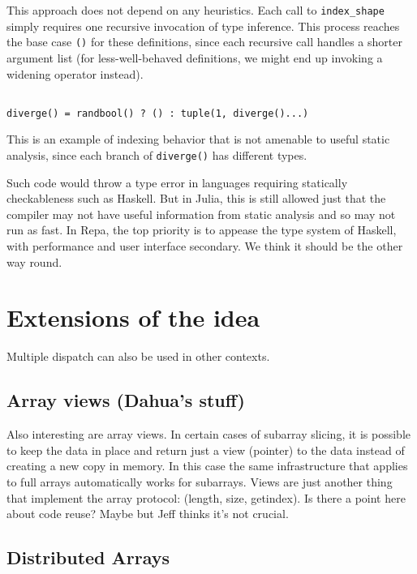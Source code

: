 \documentclass[preprint]{sigplanconf}
\newcommand{\code}[1]{\texttt{#1}}
\begin{document}
This approach does not depend on any heuristics. Each call to
\texttt{index\_shape} simply requires one recursive invocation of type
inference. This process reaches the base case \texttt{()} for these
definitions, since each recursive call handles a shorter argument list (for
less-well-behaved definitions, we might end up invoking a widening operator
instead).

\begin{verbatim}

diverge() = randbool() ? () : tuple(1, diverge()...)

\end{verbatim}

This is an example of indexing behavior that is not amenable to useful static
analysis, since each branch of \code{diverge()} has different types.


Such code would throw a type error in languages requiring statically
checkableness such as Haskell. But in Julia, this is still allowed just that
the compiler may not have useful information from static analysis and so may
not run as fast. In Repa, the top priority is to appease the type system of
Haskell, with performance and user interface secondary. We think it should be
the other way round.

\section{Extensions of the idea}

Multiple dispatch can also be used in other contexts.

\subsection{Array views (Dahua's stuff)}

Also interesting are array views. In certain cases of subarray slicing, it is
possible to keep the data in place and return just a view (pointer) to the
data instead of creating a new copy in memory. In this case the same
infrastructure that applies to full arrays automatically works for subarrays.
Views are just another thing that implement the array protocol: (length, size,
getindex). Is there a point here about code reuse? Maybe but Jeff thinks it's
not crucial.

\subsection{Distributed Arrays}
\end{document}
